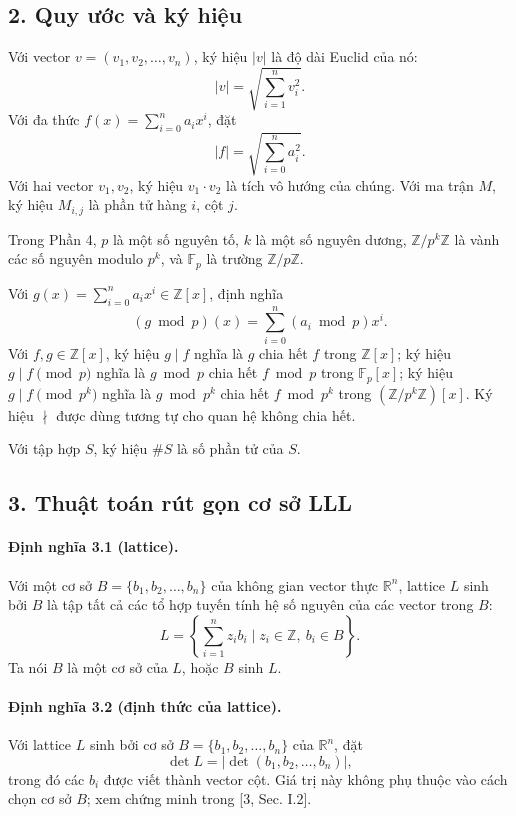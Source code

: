 \documentclass[11pt]{article}
\begin{document}
\subsection*{2. Quy ước và ký hiệu}

Với vector \(v=(v_1,v_2,\ldots,v_n)\), ký hiệu \(|v|\) là độ dài Euclid của
nó:
\[
  |v|=\sqrt{\sum_{i=1}^{n}v_i^2}.
\]
Với đa thức \(f(x)=\sum_{i=0}^{n}a_ix^i\), đặt
\[
  |f|=\sqrt{\sum_{i=0}^{n}a_i^2}.
\]
Với hai vector \(v_1,v_2\), ký hiệu \(v_1\cdot v_2\) là tích vô hướng của
chúng. Với ma trận \(M\), ký hiệu \(M_{i,j}\) là phần tử hàng \(i\), cột \(j\).

Trong Phần 4, \(p\) là một số nguyên tố, \(k\) là một số nguyên dương,
\(\mathbb Z/p^k\mathbb Z\) là vành các số nguyên modulo \(p^k\), và
\(\mathbb F_p\) là trường \(\mathbb Z/p\mathbb Z\).

Với \(g(x)=\sum_{i=0}^{n}a_ix^i\in\mathbb Z[x]\), định nghĩa
\[
  (g\bmod p)(x)=\sum_{i=0}^{n}(a_i\bmod p)x^i.
\]
Với \(f,g\in\mathbb Z[x]\), ký hiệu \(g\mid f\) nghĩa là \(g\) chia hết \(f\)
trong \(\mathbb Z[x]\); ký hiệu \(g\mid f\pmod p\) nghĩa là \(g\bmod p\) chia
hết \(f\bmod p\) trong \(\mathbb F_p[x]\); ký hiệu \(g\mid f\pmod {p^k}\)
nghĩa là \(g\bmod p^k\) chia hết \(f\bmod p^k\) trong
\((\mathbb Z/p^k\mathbb Z)[x]\). Ký hiệu \(\nmid\) được dùng tương tự cho quan
hệ không chia hết.

Với tập hợp \(S\), ký hiệu \(\#S\) là số phần tử của \(S\).

\subsection*{3. Thuật toán rút gọn cơ sở LLL}

\paragraph{Định nghĩa 3.1 (lattice).}
Với một cơ sở \(B=\{b_1,b_2,\ldots,b_n\}\) của không gian vector thực
\(\mathbb R^n\), lattice \(L\) sinh bởi \(B\) là tập tất cả các tổ hợp tuyến
tính hệ số nguyên của các vector trong \(B\):
\[
  L=\left\{\sum_{i=1}^{n}z_ib_i\mid z_i\in\mathbb Z,\ b_i\in B\right\}.
\]
Ta nói \(B\) là một cơ sở của \(L\), hoặc \(B\) sinh \(L\).

\paragraph{Định nghĩa 3.2 (định thức của lattice).}
Với lattice \(L\) sinh bởi cơ sở \(B=\{b_1,b_2,\ldots,b_n\}\) của
\(\mathbb R^n\), đặt
\[
  \det L=|\det(b_1,b_2,\ldots,b_n)|,
\]
trong đó các \(b_i\) được viết thành vector cột. Giá trị này không phụ thuộc
vào cách chọn cơ sở \(B\); xem chứng minh trong [3, Sec. I.2].
\end{document}
